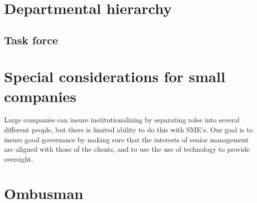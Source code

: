 \section{Departmental hierarchy}

\subsection{Task force}

\section{Special considerations for small companies}

Large companies can insure institutionalizing by separating roles into
several different people, but there is limited ability to do this with
SME's.  Our goal is to insure good governance by making sure that the
interests of senior management are aligned with those of the clients,
and to use the use of technology to provide oversight.

\section{Ombusman}


